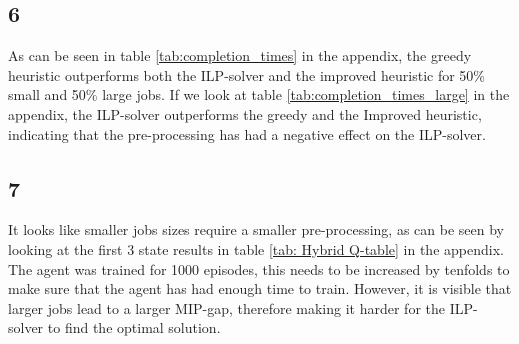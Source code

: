 \documentclass{article}
\begin{document}
\subsection*{6}
As can be seen in table \ref{tab:completion_times} in the appendix, the greedy heuristic outperforms both the ILP-solver and the improved heuristic for 50\% small and 50\% large jobs. If we look at table \ref{tab:completion_times_large} in the appendix, the ILP-solver outperforms the greedy and the Improved heuristic, indicating that the pre-processing has had a negative effect on the ILP-solver. 
\subsection*{7}
It looks like smaller jobs sizes require a smaller pre-processing, as can be seen by looking at the first 3 state results in table \ref{tab: Hybrid Q-table} in the appendix. The agent was trained for 1000 episodes, this needs to be increased by tenfolds to make sure that the agent has had enough time to train. However, it is visible that larger jobs lead to a larger MIP-gap, therefore making it harder for the ILP-solver to find the optimal solution.
\newpage
\end{document}
